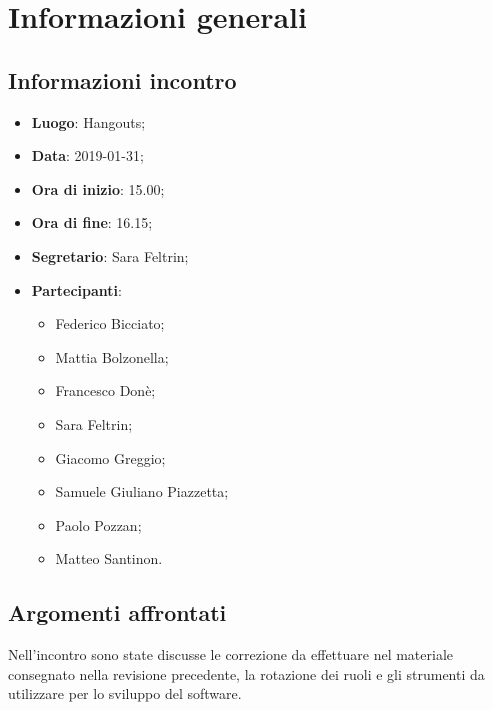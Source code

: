 \section{Informazioni generali}

\subsection{Informazioni incontro}
\begin{itemize}
\item \textbf{Luogo}: Hangouts;
\item \textbf{Data}: 2019-01-31;
\item \textbf{Ora di inizio}: 15.00;
\item \textbf{Ora di fine}: 16.15;
\item \textbf{Segretario}: Sara Feltrin;
\item \textbf{Partecipanti}: 
\begin{itemize}
	\item Federico Bicciato;
	\item Mattia Bolzonella;
	\item Francesco Donè;
	\item Sara Feltrin;
	\item Giacomo Greggio;
	\item Samuele Giuliano Piazzetta;
	\item Paolo Pozzan;
	\item Matteo Santinon.
\end{itemize}
\end{itemize}

\subsection{Argomenti affrontati}
Nell'incontro sono state discusse le correzione da effettuare nel materiale
consegnato nella revisione precedente, la rotazione dei ruoli e gli strumenti
da utilizzare per lo sviluppo del software.
